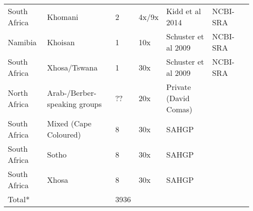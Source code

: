 \begin{landscape}
\begin{longtable}{lllllll}
South Africa & Khomani & 2 & 4x/9x & Kidd et al 2014 & NCBI-SRA \\
Namibia & Khoisan & 1 & 10x & Schuster et al 2009 & NCBI-SRA \\
South Africa & Xhosa/Tswana & 1 & 30x & Schuster et al 2009 & NCBI-SRA \\
North Africa & Arab-/Berber-speaking groups & ?? & 20x & Private (David Comas) &  \\
South Africa & Mixed (Cape Coloured) & 8 & 30x & SAHGP &  \\
South Africa & Sotho & 8 & 30x & SAHGP &  \\
South Africa & Xhosa & 8 & 30x & SAHGP &  \\
Total* &  & 3936 &  &  & 
}
\end{longtable}
\end{landscape}